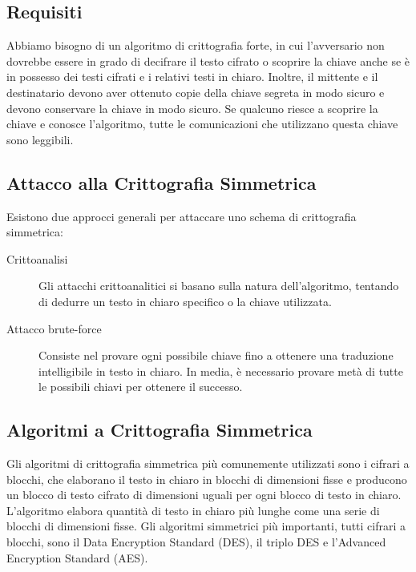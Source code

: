 \subsection{Requisiti}

Abbiamo bisogno di un algoritmo di crittografia forte, in cui l'avversario non dovrebbe essere in grado di decifrare il testo cifrato o scoprire la chiave anche se è in possesso dei testi cifrati e i relativi testi in chiaro. Inoltre, il mittente e il destinatario devono aver ottenuto copie della chiave segreta in modo sicuro e devono conservare la chiave in modo sicuro. Se qualcuno riesce a scoprire la chiave e conosce l'algoritmo, tutte le comunicazioni che utilizzano questa chiave sono leggibili.

\subsection{Attacco alla Crittografia Simmetrica}

Esistono due approcci generali per attaccare uno schema di crittografia simmetrica:

\begin{description}
    \item[Crittoanalisi] Gli attacchi crittoanalitici si basano sulla natura dell'algoritmo, tentando di dedurre un testo in chiaro specifico o la chiave utilizzata.
    
    \item[Attacco brute-force] Consiste nel provare ogni possibile chiave fino a ottenere una traduzione intelligibile in testo in chiaro. In media, è necessario provare metà di tutte le possibili chiavi per ottenere il successo.
\end{description}

\subsection{Algoritmi a Crittografia Simmetrica}

Gli algoritmi di crittografia simmetrica più comunemente utilizzati sono i cifrari a blocchi, che elaborano il testo in chiaro in blocchi di dimensioni fisse e producono un blocco di testo cifrato di dimensioni uguali per ogni blocco di testo in chiaro. L'algoritmo elabora quantità di testo in chiaro più lunghe come una serie di blocchi di dimensioni fisse. Gli algoritmi simmetrici più importanti, tutti cifrari a blocchi, sono il Data Encryption Standard (DES), il triplo DES e l'Advanced Encryption Standard (AES).

